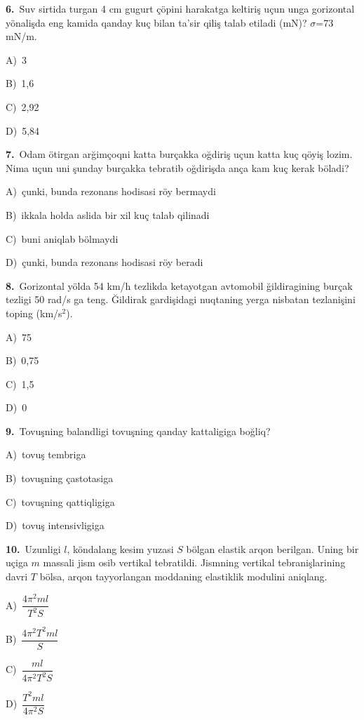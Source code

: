 \documentclass[11pt,a4paper]{article}
\newcommand{\opt}[2]{\hspace*{4mm}#1)\ #2\par}
\begin{document}
\noindent\begin{minipage}{\linewidth}
\textbf{6.}\ Suv sirtida turgan 4 cm gugurt çöpini harakatga keltiriş uçun unga gorizontal yönalişda eng kamida qanday kuç bilan ta’sir qiliş talab etiladi (mN)? $\sigma$=73 mN/m.\par\smallskip
\opt{A}{3}
\opt{B}{1,6}
\opt{C}{2,92}
\opt{D}{5,84}
\end{minipage}\vspace{9pt}\par
\noindent\begin{minipage}{\linewidth}
\textbf{7.}\ Odam ötirgan arğimçoqni katta burçakka oğdiriş uçun katta kuç qöyiş lozim. Nima uçun uni şunday burçakka tebratib oğdirişda ança kam kuç kerak böladi?\par\smallskip
\opt{A}{çunki, bunda rezonans hodisasi röy bermaydi}
\opt{B}{ikkala holda aslida bir xil kuç talab qilinadi}
\opt{C}{buni aniqlab bölmaydi}
\opt{D}{çunki, bunda rezonans hodisasi röy beradi}
\end{minipage}\vspace{9pt}\par
\noindent\begin{minipage}{\linewidth}
\textbf{8.}\ Gorizontal yölda 54 km/h tezlikda ketayotgan avtomobil ğildiragining burçak tezligi 50 rad/s ga teng. Ğildirak gardişidagi nuqtaning yerga nisbatan tezlanişini toping (km/s$^{2}$).\par\smallskip
\opt{A}{75}
\opt{B}{0,75}
\opt{C}{1,5}
\opt{D}{0}
\end{minipage}\vspace{9pt}\par
\noindent\begin{minipage}{\linewidth}
\textbf{9.}\ Tovuşning balandligi tovuşning qanday kattaligiga boğliq?\par\smallskip
\opt{A}{tovuş tembriga}
\opt{B}{tovuşning çastotasiga}
\opt{C}{tovuşning qattiqligiga}
\opt{D}{tovuş intensivligiga}
\end{minipage}\vspace{9pt}\par
\noindent\begin{minipage}{\linewidth}
\textbf{10.}\ Uzunligi $l$, köndalang kesim yuzasi $S$ bölgan elastik arqon berilgan. Uning bir uçiga $m$ massali jism osib vertikal tebratildi. Jismning vertikal tebranişlarining davri $T$ bölsa, arqon tayyorlangan moddaning elastiklik modulini aniqlang.\par\smallskip
\opt{A}{$\dfrac{4\pi^2ml}{T^2S}$}
\opt{B}{$\dfrac{4\pi^2T^2ml}{S}$}
\opt{C}{$\dfrac{ml}{4\pi^2T^2S}$}
\opt{D}{$\dfrac{T^2ml}{4\pi^2S}$}
\end{minipage}\vspace{9pt}\par
\end{document}
